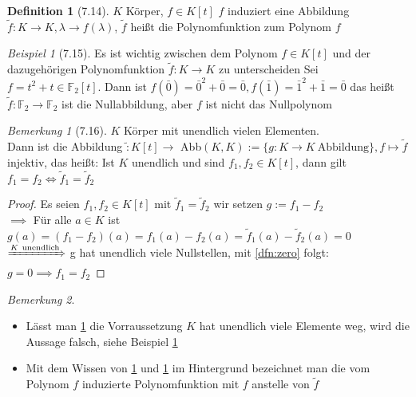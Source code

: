 \documentclass[a4paper]{scrartcl}
\theoremstyle{definition}
\newtheorem{defn}{Definition}
\theoremstyle{plain}
\theoremstyle{plain}
\theoremstyle{remark}
\newtheorem{remark}{Bemerkung}
\theoremstyle{remark}
\theoremstyle{remark}
\theoremstyle{remark}
\theoremstyle{remark}
\newtheorem{ex}{Beispiel}
\begin{document}
\begin{defn}[7.14]
$K$ Körper, $f\in K[t]$
$f$ induziert eine Abbildung $\tilde f: K\to K,\lambda\to f(\lambda)$, $\tilde f$ heißt die Polynomfunktion zum Polynom $f$
\end{defn}
\begin{ex}[7.15]
\label{ex:715}
Es ist wichtig zwischen dem Polynom $f\in K[t]$ und der dazugehörigen Polynomfunktion $\tilde f: K\to K$ zu unterscheiden
Sei $f = t^2 + t \in \mathbb{F}_2 [t]$. Dann ist $f(\bar 0) = \bar 0^2 + \bar 0 = \bar 0, f(\bar 1) = \bar 1^2 + \bar 1 = \bar 0$
das heißt $\tilde f: \mathbb{F}_2 \to \mathbb{F}_2$ ist die Nullabbildung, aber $f$ ist nicht das Nullpolynom
\end{ex}
\begin{remark}[7.16]
\label{remark:716}
$K$ Körper mit unendlich vielen Elementen. \\
  Dann ist die Abbildung $\tilde : K[t]\to$ Abb$(K,K):=\{g:K\to K ~\text{Abbildung}\}, f\mapsto \tilde f$ injektiv, das heißt:
Ist $K$ unendlich und sind $f_1,f_2 \in K[t]$, dann gilt $f_1 = f_2 \iff \tilde f_1 = \tilde f_2$
\end{remark}
\begin{proof}
Es seien $f_1,f_2 \in K[t]$ mit $\tilde f_1 = \tilde f_2$ wir setzen $g:= f_1 - f_2$ \\
  $\implies$ Für alle $a\in K$ ist $g(a) = (f_1 - f_2)(a) = f_1(a) - f_2(a) = \tilde f_1(a) - \tilde f_2(a) = 0$
$\xRightarrow{K~\text{unendlich}}$ g hat unendlich viele Nullstellen, mit \ref{dfn:zero} folgt: $g = 0\implies f_1 = f_2$
\end{proof}
\begin{remark}
\begin{itemize}
\item Lässt man \ref{remark:716} die Vorraussetzung $K$ hat unendlich viele Elemente weg, wird die Aussage falsch, siehe Beispiel \ref{ex:715}
\item Mit dem Wissen von \ref{ex:715} und \ref{remark:716} im Hintergrund bezeichnet man die vom Polynom $f$ induzierte Polynomfunktion mit $f$ anstelle von $\tilde f$
\end{itemize}
\end{remark}
\end{document}

